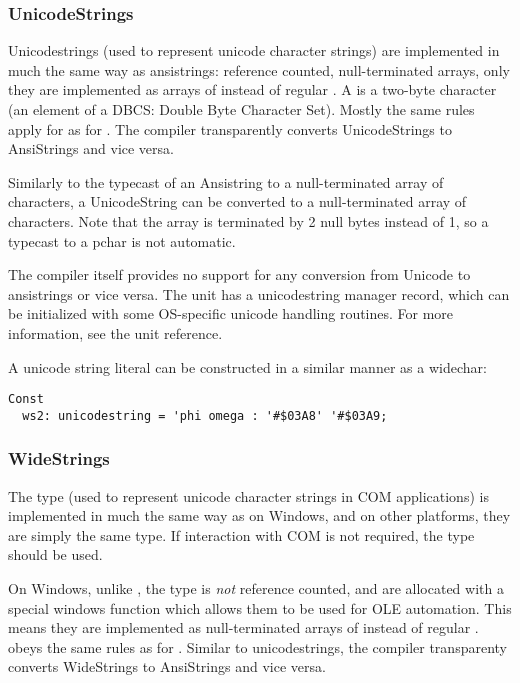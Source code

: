 \subsubsection{UnicodeStrings}
Unicodestrings (used to represent unicode character strings) are implemented in much
the same way as ansistrings: reference counted, null-terminated arrays, only they
are implemented as arrays of  instead of regular .
A  is a two-byte character (an element of a DBCS: Double Byte
Character Set). Mostly the same rules apply for  as for
. The compiler transparently converts UnicodeStrings to
AnsiStrings and vice versa. 

Similarly to the typecast of an Ansistring to a  null-terminated
 array of characters, a UnicodeString can be converted to a
 null-terminated array of characters. Note that the
 array is terminated by 2 null bytes instead of
1, so a typecast to a pchar is not automatic.

The compiler itself provides no support for any conversion from Unicode to
ansistrings or vice versa. The  unit has a unicodestring manager
record, which can be initialized with some OS-specific unicode handling
routines. For more information, see the  unit reference.

A unicode string literal can be constructed in a similar manner as a widechar:
\begin{verbatim}
Const
  ws2: unicodestring = 'phi omega : '#$03A8' '#$03A9;
\end{verbatim}


\subsubsection{WideStrings}
The  type (used to represent unicode character strings in COM applications)
is implemented in much the same way as  on Windows, and on other
platforms, they are simply the same type. If interaction with COM is not required,
the  type should be used.

On Windows, unlike , the  type is \emph{not} reference counted,
and are allocated with a special windows function which allows them to be used for OLE automation.
This means they are implemented as null-terminated arrays of  instead of regular .
 obeys the same rules as for .
Similar to unicodestrings, the compiler transparenty converts WideStrings
to AnsiStrings and vice versa. 

